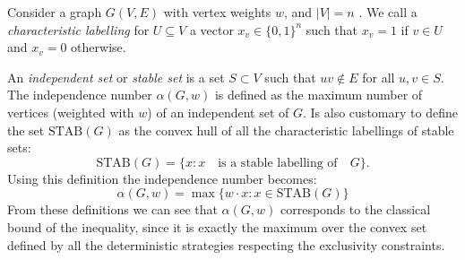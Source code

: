 \documentclass[letterpaper]{article}
\newcommand{\STAB}{\mathrm{STAB}}
\begin{document}
Consider a graph $G(V,E)$ with vertex weights $w$, and $|V| = n$ .
We call a \emph{characteristic labelling} for $U \subseteq V$ a vector $x_v \in
\{0,1\}^n$ such that $x_v = 1$ if $v \in U$ and $x_v = 0$ otherwise.

An \emph{independent set} or \emph{stable set} is a set
$S \subset V$ such that $uv \notin E$ for all $u,v \in S$.
The independence number $\alpha(G, w)$ is defined as the maximum number of
vertices (weighted with $w$) of an independent set of $G$. Is also customary to
define the set $\STAB(G)$ as the convex hull of all the
characteristic labellings of stable sets:
\begin{equation} 
    \STAB(G) = \{x : x \quad \text{is a stable labelling of}\quad G \}.
    \label{eq:stab}
\end{equation}
Using this definition the independence number becomes:
\begin{equation}
    \alpha(G,w) = \max\{w\cdot x: x \in \STAB(G)\}
    \label{eq:alphastab}
\end{equation}
From these definitions we can see that $\alpha(G,w)$ corresponds to the classical bound of the inequality, since it is exactly the maximum over the convex set defined by all the deterministic strategies respecting the exclusivity constraints.
\end{document}
